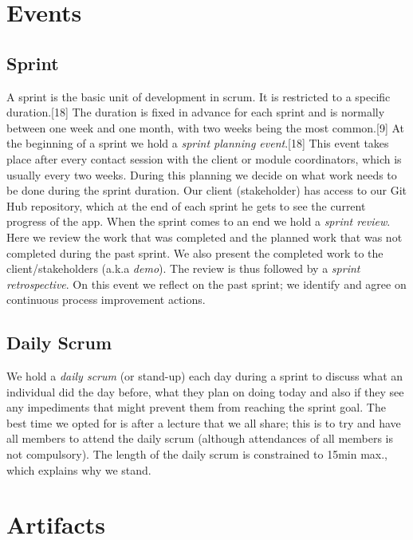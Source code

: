 \documentclass[hidelinks, 12pt, oneside]{article}
\begin{document}
	\section{Events}
	\subsection{Sprint}
	A sprint is the basic unit of development in scrum. It is restricted to a specific duration.[18] The duration is fixed in advance for each sprint and is 
	normally between one week and one month, with two weeks being the most common.[9]\newline\newline
	At the beginning of a sprint we hold a \emph{sprint planning event}.[18] This event takes place after every contact session with the client or module coordinators,
	which is usually every two weeks. During this planning we decide on what work needs to be done during the sprint duration. Our client (stakeholder) has access 
	to our Git Hub repository, which at the end of each sprint he gets to see the current progress of the app.\newline
	When the sprint comes to an end we hold a \emph{sprint review}. Here we review the work that was completed and the planned work that was not completed during the 
	past sprint. We also present the completed work to the client/stakeholders (a.k.a \emph{demo}).\newline
	The review is thus followed by a \emph{sprint retrospective}. On this event we reflect on the past sprint; we identify and agree on continuous process improvement actions. 
	\subsection{Daily Scrum}
 	We hold a \emph{daily scrum} (or stand-up) each day during a sprint to discuss what an individual did the day before, what they plan on doing today and also if they 
 	see any impediments that might prevent them from reaching the sprint goal. The best time we opted for is after a lecture that we all share; this is to try and have 
 	all members	to attend the daily scrum (although attendances of all members is not compulsory). The length of the daily scrum is constrained to 15min max., which explains 
 	why we stand.\newpage 
 	
 	\section{Artifacts}
\end{document}
